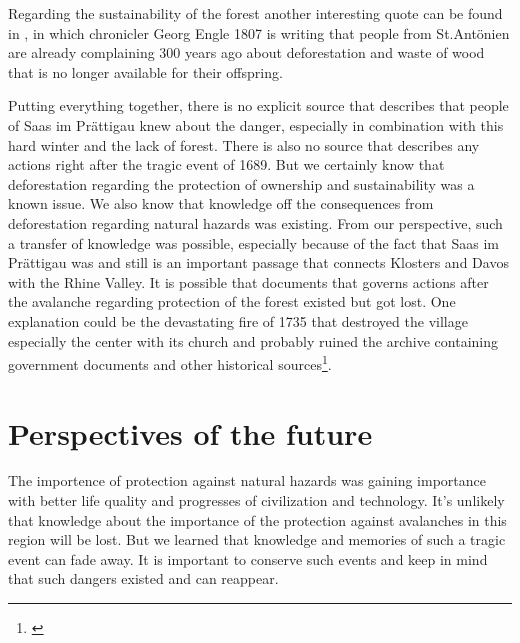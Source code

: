 \documentclass[12pt, a4paper]{article}
\begin{document}
Regarding the sustainability of the forest another interesting quote can be found in \citet[p.~7]{finze1988geschichte}, 
in which chronicler Georg Engle 1807 is writing that people from St.Antönien are already complaining 300 years ago about 
deforestation and waste of wood that is no longer available for their offspring. 

Putting everything together, there is no explicit source that describes that people of Saas im Prättigau knew about the 
danger, especially in combination with this hard winter and the lack of forest. There is also no source that describes 
any actions right after the tragic event of 1689. But we certainly know that deforestation regarding the protection of 
ownership and sustainability was a known issue. We also know that knowledge off the consequences from deforestation 
regarding natural hazards was existing. From our perspective, such a transfer of knowledge was possible, especially because 
of the fact that Saas im Prättigau was and still is an important passage that connects Klosters and Davos with the 
Rhine Valley. It is possible that documents that governs actions after the avalanche regarding protection of the 
forest existed but got lost. One explanation could be the devastating fire of 1735 that destroyed the village especially the 
center with its church and probably ruined the archive containing government documents and other historical 
sources\footnote{\citet[p.~55]{hansemann1995saaser}}. 

\section*{Perspectives of the future}
The importence of protection against natural hazards was gaining importance with better life quality and progresses of 
civilization and technology. It's unlikely that knowledge about the importance of the protection against avalanches in this 
region will be lost. But we learned that knowledge and memories of such a tragic event can fade away. It is important to 
conserve such events and keep in mind that such dangers existed and can reappear.


\end{document}
